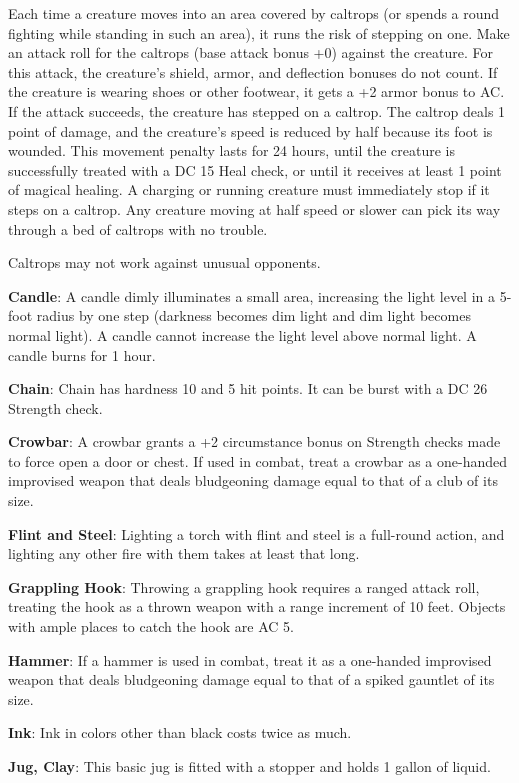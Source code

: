 Each time a creature moves into an area covered by caltrops (or spends a round fighting while standing in such an area), it runs the risk of stepping on one. Make an attack roll for the caltrops (base attack bonus +0) against the creature. For this attack, the creature's shield, armor, and deflection bonuses do not count. If the creature is wearing shoes or other footwear, it gets a +2 armor bonus to AC. If the attack succeeds, the creature has stepped on a caltrop. The caltrop deals 1 point of damage, and the creature's speed is reduced by half because its foot is wounded. This movement penalty lasts for 24 hours, until the creature is successfully treated with a DC 15 Heal check, or until it receives at least 1 point of magical healing. A charging or running creature must immediately stop if it steps on a caltrop. Any creature moving at half speed or slower can pick its way through a bed of caltrops with no trouble.
		
Caltrops may not work against unusual opponents.
		
\textbf{Candle}: A candle dimly illuminates a small area, increasing the light level in a 5-foot radius by one step (darkness becomes dim light and dim light becomes normal light). A candle cannot increase the light level above normal light. A candle burns for 1 hour.
		
\textbf{Chain}: Chain has hardness 10 and 5 hit points. It can be burst with a DC 26 Strength check.
		
\textbf{Crowbar}: A crowbar grants a +2 circumstance bonus on Strength checks made to force open a door or chest. If used in combat, treat a crowbar as a one-handed improvised weapon that deals bludgeoning damage equal to that of a club of its size.
		
\textbf{Flint and Steel}: Lighting a torch with flint and steel is a full-round action, and lighting any other fire with them takes at least that long.
		
\textbf{Grappling Hook}: Throwing a grappling hook requires a ranged attack roll, treating the hook as a thrown weapon with a range increment of 10 feet. Objects with ample places to catch the hook are AC 5.
		
\textbf{Hammer}: If a hammer is used in combat, treat it as a one-handed improvised weapon that deals bludgeoning damage equal to that of a spiked gauntlet of its size.
		
\textbf{Ink}: Ink in colors other than black costs twice as much.
		
\textbf{Jug, Clay}: This basic jug is fitted with a stopper and holds 1 gallon of liquid.
		
